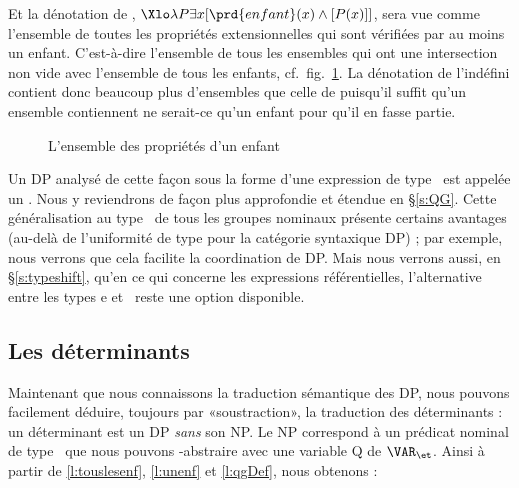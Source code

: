 Et la dénotation de , \(\Xlo\lambda P\exists x [\prd{enfant}(x)\wedge[P(x)]]\), sera vue comme l'ensemble de toutes les propriétés extensionnelles qui sont vérifiées par au moins un enfant. C'est-à-dire l'ensemble de tous les ensembles qui ont une intersection non vide avec l'ensemble de tous les enfants, cf.\ fig.~\ref{f:QGEx}.  La dénotation de l'indéfini  contient donc beaucoup plus d'ensembles que celle de  puisqu'il suffit qu'un ensemble contiennent ne serait-ce qu'un enfant pour qu'il en fasse partie.


\begin{figure}[h!]
\begin{center}
\scalebox{.8}{%
%
}
\end{center}
\caption{L'ensemble des propriétés d'un enfant}\label{f:QGEx}
\end{figure}


Un DP analysé de cette façon sous la forme d'une expression de type \ett\ est %
appelée un .  Nous y reviendrons de façon plus approfondie et étendue en  \S\ref{s:QG}.
Cette généralisation au type \ett\ de tous les groupes nominaux présente certains avantages (au-delà de l'uniformité de type pour la catégorie syntaxique  DP) ; par exemple, nous verrons que cela facilite la coordination de DP.  Mais nous verrons aussi, en \S\ref{s:typeshift}, qu'en ce qui concerne les expressions référentielles, l'alternative entre les types \typ e et \ett\ reste une option disponible.

\medskip




\subsection{Les déterminants}
\label{ss:déterminants}

Maintenant que nous connaissons la traduction sémantique des DP, nous pouvons facilement déduire, toujours par «soustraction», la traduction des déterminants : un déterminant est un DP \emph{sans} son NP.  Le NP correspond à un prédicat nominal de type \et\ que nous pouvons \lamb-abstraire avec une variable \vrb Q de $\VAR_{\et}$.  Ainsi à partir de \ref{l:touslesenf}, \ref{l:unenf} et \ref{l:qgDef}, nous obtenons : 

